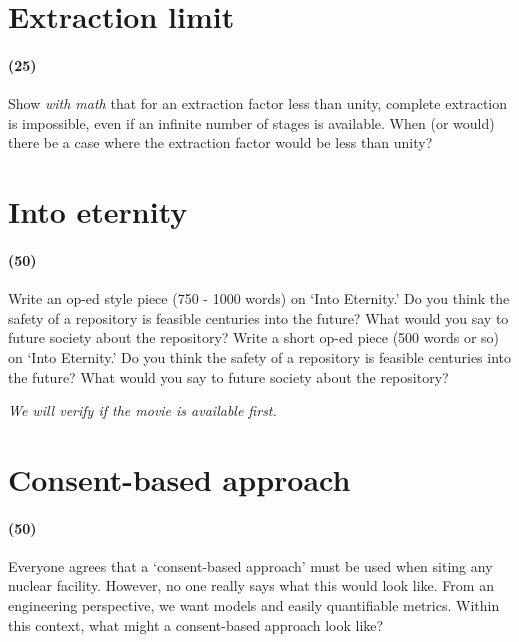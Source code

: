 \documentclass[11pt,a4paper]{article}
\begin{document}
\newpage

\section{Extraction limit}
\paragraph*{(25)}
Show \textit{with math} that for an extraction factor less than unity, complete extraction is impossible, even if an infinite number of stages is available. When (or would) there be a case where the extraction factor would be less than unity?





\newpage

\section{Into eternity}
\paragraph*{(50)}
Write an op-ed style piece (750 - 1000 words) on `Into Eternity.' Do you think the safety of a repository is feasible centuries into the future? What would you say to future society about the repository? Write a short op-ed piece (500 words or so) on ‘Into Eternity.’ Do you think the safety of a repository is feasible centuries into the future? What would you say to future society about the repository?

\vspace{\baselineskip}

\noindent\textit{We will verify if the movie is available first.}





\newpage

\section{Consent-based approach}
\paragraph*{(50)}
Everyone agrees that a `consent-based approach' must be used when siting any nuclear facility. However, no one really says what this would look like. From an engineering perspective, we want models and easily quantifiable metrics. Within this context, what might a consent-based approach look like?
\end{document}
